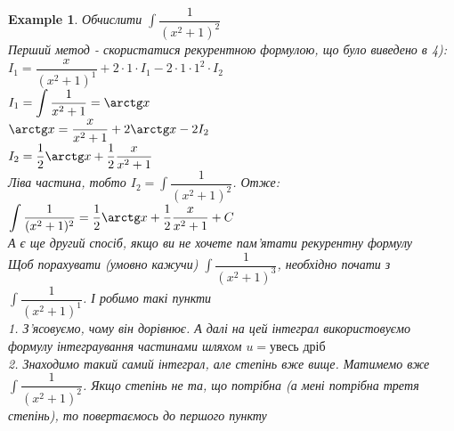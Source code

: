 \documentclass[a4paper, 14pt]{extarticle}
\def\huge{\displaystyle}
\def\bigline{\vspace{5mm}\\}
\theoremstyle{theoremdd}
\theoremstyle{theoremdd}
\theoremstyle{theoremdd}
\theoremstyle{theoremdd}
\newtheorem{example}[theorem]{Example}
\theoremstyle{theoremdd}
\theoremstyle{theoremdd}
\theoremstyle{theoremdd}
\theoremstyle{theoremdd}
\begin{document}
\begin{example}
Обчислити $\huge \int \dfrac{1}{(x^2+1)^2}$\\
Перший метод - скористатися рекурентною формулою, що було виведено в 4):\\
$I_1 = \dfrac{x}{(x^2+1)^1} + 2 \cdot 1 \cdot I_1 - 2 \cdot 1 \cdot 1^2 \cdot I_2$\\
$I_1 = \huge \int \dfrac{1}{x^2+1} = \arctg x$\\
$\arctg x = \dfrac{x}{x^2+1} + 2 \arctg x - 2 I_2$\\
$I_2 = \dfrac{1}{2} \arctg x + \dfrac{1}{2} \dfrac{x}{x^2+1}$\\
Ліва частина, тобто $I_2 = \huge \int \dfrac{1}{(x^2+1)^2}$. Отже:\\
$\huge \int \dfrac{1}{(x^2+1)^2} = \dfrac{1}{2} \arctg x + \dfrac{1}{2} \dfrac{x}{x^2+1} + C$
\bigline
А є ще другий спосіб, якщо ви не хочете пам'ятати рекурентну формулу\\
Щоб порахувати (умовно кажучи) $\huge \int \dfrac{1}{(x^2+1)^3}$, необхідно почати з $\huge \int \dfrac{1}{(x^2+1)^1}$. І робимо такі пункти\\
1. З'ясовуємо, чому він дорівнює. А далі на цей інтеграл використовуємо формулу інтеграування частинами шляхом $u = \text{увесь дріб}$\\
2. Знаходимо такий самий інтеграл, але степінь вже вище. Матимемо вже $\huge \int \dfrac{1}{(x^2+1)^2}$. Якщо степінь не та, що потрібна (а мені потрібна третя степінь), то повертаємось до першого пункту
\end{example}
\medskip
\end{document}
